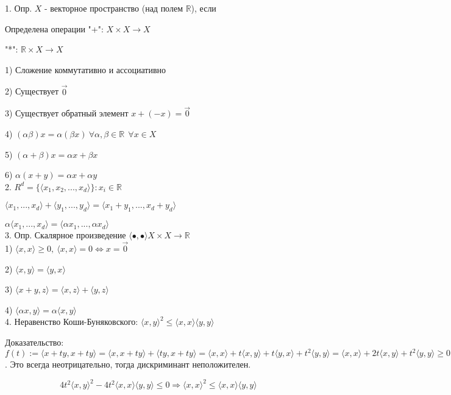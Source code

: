 \documentclass[12pt]{article}
\begin{document}
1. Опр. $X$ - векторное пространство (над полем $\mathbb{R}$), если

Определена операции "+": $X\times X \to X$

"*": $\mathbb{R}\times X \to X$

1) Сложение коммутативно и ассоциативно

2) Существует $\overrightarrow{0}$

3) Существует обратный элемент $x+(-x)=\overrightarrow{0}$

4) $(\alpha \beta)x = \alpha(\beta x)\ \forall \alpha, \beta \in \mathbb{R}\ \ \forall x\in X$

5) $(\alpha+\beta)x = \alpha x + \beta x$

6) $\alpha(x+y) = \alpha x + \alpha y$\\

2. $R^d = \{ \langle x_1, x_2,...,x_d\rangle  \}: x_i \in \mathbb{R}$

$\langle x_1,...,x_d\rangle +\langle y_1,...,y_d\rangle =\langle x_1+y_1,..., x_d + y_d\rangle $

$\alpha \langle x_1,...,x_d\rangle  = \langle \alpha x_1,..., \alpha x_d\rangle $\\

3. Опр. Скалярное произведение $\langle \bullet, \bullet\rangle X\times X \to \mathbb{R}$\\

1) $\langle x, x\rangle \geq 0,\ \langle x, x\rangle =0 \Leftrightarrow x=\overrightarrow{0}$

2) $\langle x, y\rangle = \langle y, x\rangle$

3) $\langle x+y, z\rangle = \langle x, z\rangle + \langle y, z \rangle $

4) $\langle \alpha x, y\rangle = \alpha \langle x, y \rangle $\\

4. Неравенство Коши-Буняковского: $\langle x, y \rangle^2 \leq \langle x, x \rangle \langle y, y \rangle$

Доказательство:\\

$f(t):=\langle x+ty, x+ty\rangle = \langle x, x+ty \rangle + \langle ty, x+ty \rangle =\langle x, x \rangle + t\langle x, y \rangle + t\langle y, x \rangle + t^2\langle y, y \rangle = \langle x, x \rangle + 2t\langle x, y \rangle + t^2\langle y, y \rangle \geq 0$. Это всегда неотрицательно, тогда дискриминант неположителен.

\[4t^2\langle x, y \rangle^2 - 4t^2\langle x, x \rangle \langle y, y \rangle \leq 0 \Rightarrow \langle x, x \rangle^2 \leq \langle x, x \rangle \langle y, y \rangle\]
\newpage
\end{document}
